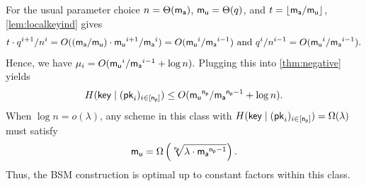 For the usual parameter choice $n=\Theta(\mathsf{m_a})$, $\mathsf{m_u}=\Theta(q)$, and $t=\lfloor\mathsf{m_a}/\mathsf{m_u}\rfloor$, \cref{lem:localkeyind} gives
\[
t\cdot q^{i+1}/n^i
=
O((\amem/\umem)\cdot \umem^{i+1}/\amem^i)
=
O(\umem^i/\amem^{i-1})
\ 
\mbox{and}
\
q^i/n^{i-1}
=
O(\umem^i/\amem^{i-1}).
\]
Hence, we have
$
\mu_i=
O(\mathsf{m_u}^i/\mathsf{m_a}^{i-1}+\log n).
$
Plugging this into \cref{thm:negative} yields
\[
H(\mathsf{key}\mid(\mathsf{pk}_i)_{i\in[\mathsf{n_p}]})
\leq
O(\mathsf{m_u}^{\mathsf{n_p}}/\mathsf{m_a}^{\mathsf{n_p}-1}+\log n).
\]
When $\log n=o(\lambda)$, any scheme in this class with
$H(\mathsf{key}\mid(\mathsf{pk}_i)_{i\in[\mathsf{n_p}]})=\Omega(\lambda)$ must satisfy
\[
\mathsf{m_u}=\Omega\left(\sqrt[\mathsf{n_p}]{\lambda\cdot\mathsf{m_a}^{\mathsf{n_p}-1}}\right).
\]
Thus, the BSM construction is optimal up to constant factors within this class.
%
